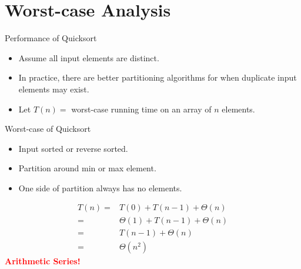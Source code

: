 \documentclass{beamer}
\begin{document}
\section{Worst-case Analysis}

\begin{frame}{Performance of Quicksort}
    \begin{itemize}
        \item Assume all input elements are distinct. \pause
        \item In practice, there are better partitioning algorithms for when duplicate input elements may exist. \pause
        \item Let $T(n) =$ worst-case running time on an array of $n$ elements.
    \end{itemize}
\end{frame}

\begin{frame}{Worst-case of Quicksort}
    \begin{itemize}
        \item Input sorted or reverse sorted. \pause
        \item Partition around min or max element. \pause
        \item One side of partition always has no elements. \pause
    \end{itemize}
    \begin{equation*}
        \begin{split}
            T(n) =& T(0) + T(n - 1) + \Theta(n) \\
                    =& \Theta(1) + T(n - 1) + \Theta(n) \\
                    =& T(n - 1) + \Theta(n) \\
                    =& \Theta(n^2)
        \end{split}
    \end{equation*}
    \pause
    \centering
    \textcolor{red}{\textbf{Arithmetic Series!}}
\end{frame}
\end{document}
